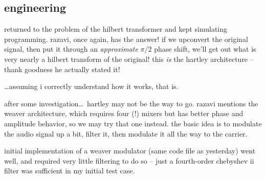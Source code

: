 \subsection*{engineering}
returned to the problem of the hilbert transformer and kept simulating \amp
programming. razavi, once again, has the answer! if we upconvert the original
signal, then put it through an \emph{approximate} \(\pi/2\) phase shift, we'll
get out what is very nearly a hilbert transform of the original! this \emph{is}
the hartley architecture -- thank goodness he actually stated it!

\ldots assuming i correctly understand how it works, that is.

after some investigation\ldots\ hartley may not be the way to go. razavi
mentions the weaver architecture, which requires four (!) mixers but has better
phase and amplitude behavior, so we may try that one instead. the basic idea is
to modulate the audio signal up a bit, filter it, then modulate it all the way
to the \rf carrier.

initial implementation of a weaver modulator (same code file as yesterday) went
well, and required very little filtering to do so -- just a fourth-order
chebyshev ii filter was sufficient in my initial test case.
